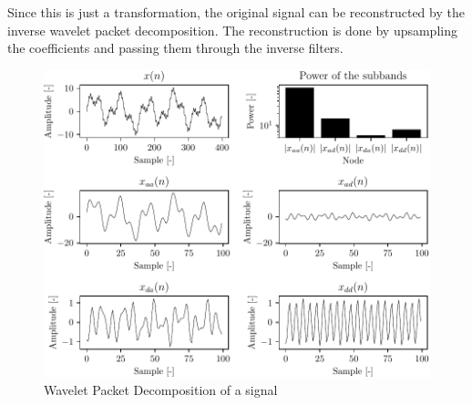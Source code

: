 Since this is just a transformation, the original signal can be reconstructed by the inverse wavelet packet decomposition. The reconstruction is done by upsampling the coefficients and passing them through the inverse filters.


\begin{figure}
\centering
\includegraphics{images/WPD_result.pdf}
\caption{Wavelet Packet Decomposition of a signal}
\end{figure}

